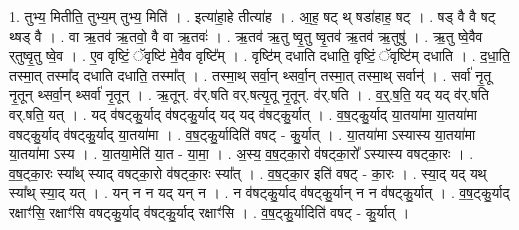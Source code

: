 \documentclass[17pt]{extarticle}
\begin{document}
1. तुभ्य॒ मितीति॒ तुभ्य॒म् तुभ्य॒ मिति॑ । . इत्या॑हा॒हे तीत्या॑ह । . आ॒ह॒ षट् थ् षडा॑हाह॒ षट् । . षड् वै वै षट् थ्षड् वै । . वा ऋ॒तव॑ ऋ॒तवो॒ वै वा ऋ॒तवः॑ । . ऋ॒तव॑ ऋ॒तु ष्वृ॒तु ष्वृ॒तव॑ ऋ॒तव॑ ऋ॒तुषु॑ । . ऋ॒तु ष्वे॒वैव र्‌तुष्वृ॒तु ष्वे॒व । . ए॒व वृष्टिं॒ ॅवृष्टि॑ मे॒वैव वृष्टि᳚म् । . वृष्टि॑म् दधाति दधाति॒ वृष्टिं॒ ॅवृष्टि॑म् दधाति । . द॒धा॒ति॒ तस्मा॒त् तस्मा᳚द् दधाति दधाति॒ तस्मा᳚त् । . तस्मा॒थ् सर्वा॒न् थ्सर्वा॒न् तस्मा॒त् तस्मा॒थ् सर्वान्॑ । . सर्वा॑ नृ॒तू नृ॒तून् थ्सर्वा॒न् थ्सर्वा॑ नृ॒तून् । . ऋ॒तून्. व॑र्.षति वर्.षत्यृ॒तू नृ॒तून्. व॑र्.षति । . व॒र्॒.ष॒ति॒ यद् यद् व॑र्.षति वर्.षति॒ यत् । . यद् व॑षट्कु॒र्याद् व॑षट्कु॒र्याद् यद् यद् व॑षट्कु॒र्यात् । . व॒ष॒ट्कु॒र्याद् या॒तया॑मा या॒तया॑मा वषट्कु॒र्याद् व॑षट्कु॒र्याद् या॒तया॑मा । . व॒ष॒ट्कु॒र्यादिति॑ वषट् - कु॒र्यात् । . या॒तया॑मा ऽस्यास्य या॒तया॑मा या॒तया॑मा ऽस्य । . या॒तया॒मेति॑ या॒त - या॒मा॒ । . अ॒स्य॒ व॒ष॒ट्का॒रो व॑षट्का॒रो᳚ ऽस्यास्य वषट्का॒रः । . व॒ष॒ट्का॒रः स्या᳚थ् स्याद् वषट्का॒रो व॑षट्का॒रः स्या᳚त् । . व॒ष॒ट्का॒र इति॑ वषट् - का॒रः । . स्या॒द् यद् यथ् स्या᳚थ् स्या॒द् यत् । . यन् न न यद् यन् न । . न व॑षट्कु॒र्याद् व॑षट्कु॒र्यान् न न व॑षट्कु॒र्यात् । . व॒ष॒ट्कु॒र्याद् रक्षाꣳ॑सि॒ रक्षाꣳ॑सि वषट्कु॒र्याद् व॑षट्कु॒र्याद् रक्षाꣳ॑सि । . व॒ष॒ट्कु॒र्यादिति॑ वषट् - कु॒र्यात् । \newline
\end{document}
